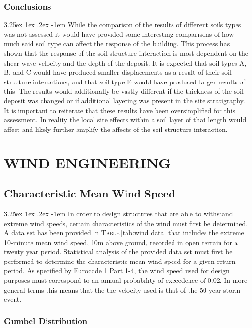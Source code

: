 \documentclass[11pt,a4paper,titlepage]{report}
\makeatletter
\renewcommand\paragraph{\@startsection{paragraph}{5}{\z@}%
  {3.25ex \@plus1ex \@minus.2ex}%
  {-1em}%
  {\normalfont\normalsize\bfseries}}
\makeatother
\begin{document}
\section{Conclusions}
\paragraph{}While the comparison of the results of different soils types was not assessed it would have provided some interesting comparisons of how much said soil type can affect the response of the building. This process has shown that the response of the soil-structure interaction is most dependent on the shear wave velocity and the depth of the deposit. It is expected that soil types A, B, and C would have produced smaller displacements as a result of their soil structure interactions, and that soil type E would have produced larger results of this. The results would additionally be vastly different if the thickness of the soil deposit was changed or if additional layering was present in the site stratigraphy. It is important to reiterate that these results have been oversimplified for this assessment. In reality the local site effects within a soil layer of that length would affect and likely further amplify the affects of the soil structure interaction. 
\newpage 
\part{WIND ENGINEERING}
\chapter{Characteristic Mean Wind Speed}
\paragraph{}In order to design structures that are able to withstand extreme wind speeds, certain characteristics of the wind must first be determined. A data set has been provided in \textsc{Table}\,\ref{tab:wind data} that includes the extreme 10-minute mean wind speed, 10m above ground, recorded in open terrain for a twenty year period. Statistical analysis of the provided data set must first be performed to determine the characteristic mean wind speed for a given return period. As specified by Eurocode 1 Part 1-4, the wind speed used for design purposes must correspond to an annual probability of exceedence of 0.02. In more general terms this means that the the velocity used is that of the 50 year storm event. 
\section{Gumbel Distribution}
\end{document}

